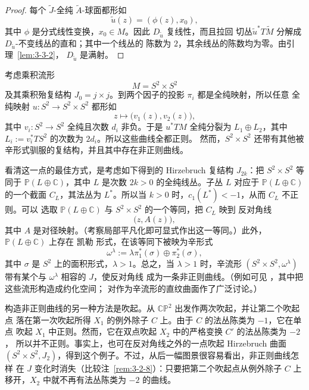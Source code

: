 \begin{proof}
每个 $\widetilde J$-全纯 $\widetilde A$-球面都形如
\[
  \widetilde u(z)=(\phi(z),x_0),
\]
其中 $\phi$ 是分式线性变换，$x_0\in M$。因此 $D_{\widetilde u}$ 复线性，而且拉回
切丛$\widetilde u^*T\widetilde M$ 分解成
$D_{\widetilde u}$-不变线丛的直和；其中一个线丛的
陈数为 $2$，其余线丛的陈数均为零。由引理~\ref{lem:3-3-2}，
$D_{\widetilde u}$ 是满射。
\end{proof}

\begin{example}\label{ex:3-3-6}
考虑乘积流形
\[
  M=S^2\times S^2
\]
及其乘积殆复结构 $J_0=j\times j$。到两个因子的投影 $\pi_i$ 都是全纯映射，所以任意
全纯映射 $u:S^2\to S^2\times S^2$ 都形如
\[
  z\longmapsto\bigl(v_1(z),v_2(z)\bigr),
\]
其中 $v_i:S^2\to S^2$ 全纯且次数 $d_i$ 非负。于是 $u^*TM$ 全纯分裂为
$L_1\oplus L_2$，其中 $L_i:=v_i^*TS^2$ 的次数为 $2d_i$。所以这些曲线全都正则。
然而，$S^2\times S^2$ 还带有其他被辛形式驯服的复结构，并且其中存在非正则曲线。

看清这一点的最佳方式，是考虑如下得到的 Hirzebruch 复结构 $J_{2k}$：把
$S^2\times S^2$ 等同于 $\mathbb P(L\oplus\mathbb C)$，其中 $L$ 是次数
$2k>0$ 的全纯线丛。子丛 $L$ 对应于 $\mathbb P(L\oplus\mathbb C)$ 的一个截面
$C_L$，其法丛为 $L^*$。所以当 $k>0$ 时，$c_1(L^*)<-1$，从而 $C_L$ 不正则。可以
选取 $\mathbb P(L\oplus\mathbb C)$ 与 $S^2\times S^2$ 的一个等同，把 $C_L$ 映到
反对角线
\[
  \bigl(z,A(z)\bigr),
\]
其中 $A$ 是对径映射。（考察局部平凡化即可显式作出这一等同。）此外，
$\mathbb P(L\oplus\mathbb C)$ 上存在 凯勒 形式，在该等同下被映为辛形式
\[
  \omega^\lambda:=\lambda\pi_1^*(\sigma)\oplus\pi_2^*(\sigma),
\]
其中 $\sigma$ 是 $S^2$ 上的面积形式，$\lambda>1$。总之，当 $\lambda>1$ 时，辛流形
$(S^2\times S^2,\omega^\lambda)$ 带有某个与 $\omega^\lambda$ 相容的 $J$，使反对角线
成为一条非正则曲线。（例如可见 ，其中把这些流形构造成约化空间；
 对作为辛流形的直纹曲面作了广泛讨论。）

构造非正则曲线的另一种方法是吹起。从 $\mathbb{CP}^2$ 出发作两次吹起，并让第二个吹起点
落在第一次吹起所得 $X_1$ 的例外除子 $C$ 上。由于 $C$ 的法丛陈类为 $-1$，它在单点
吹起 $X_1$ 中正则。然而，它在双点吹起 $X_2$ 中的严格变换 $C'$ 的法丛陈类为 $-2$，
所以并不正则。事实上，也可在反对角线之外的一点吹起 Hirzebruch 曲面
$(S^2\times S^2,J_2)$，得到这个例子。不过，从后一幅图景很容易看出，非正则曲线怎样
在 $J$ 变化时消失（比较注~\ref{rem:3-2-8}）：只要把第二个吹起点从例外除子 $C$ 上
移开，$X_2$ 中就不再有法丛陈类为 $-2$ 的曲线。
\end{example}

